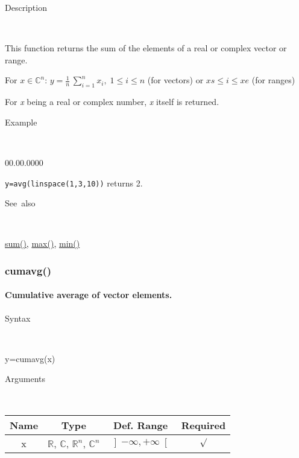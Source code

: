\begin{description}
\item [Description]~
\end{description}
This function returns the sum of the elements of a real or complex
vector or range.

\medskip{}
For $x\in$$\mathbb{C}^{n}$: $y={\displaystyle \frac{1}{n}}\,$$\sum\limits _{i=1}^{n}x_{i},\;1\leq i\leq n$
(for vectors) or $xs\leq i\leq xe$ (for ranges)
\medskip{}

For \textit{x} being a real or complex number, \textit{x}
itself is returned.

\begin{description}
\item [Example]~
\end{description}
\begin{lyxlist}{00.00.0000}
\item [\texttt{y=avg(linspace(1,3,10))}]returns 2.
\end{lyxlist}
\begin{description}
\item [See~also]~
\end{description}
\textcolor{blue}{\hyperlink{sum}{sum()}}\textcolor{black}{,} \textcolor{blue}{\hyperlink{max}{max()}}\textcolor{black}{,}
\textcolor{blue}{\hyperlink{min}{min()}}


\newpage
\subsubsection*{\hypertarget{cumavg}{}{\Large cumavg()}}


\paragraph{\label{par:Cumulative-average}Cumulative average of vector elements.}

\begin{description}
\item [Syntax]~
\end{description}
y=cumavg(x)

\begin{description}
\item [Arguments]~
\end{description}
\begin{tabular}{|c|c|c|c|}
\hline 
Name&
Type&
Def. Range&
Required\tabularnewline
\hline
\hline 
x&
$\mathbb{R}$, $\mathbb{C}$, $\mathbb{R}^{n}$, $\mathbb{C}^{n}$&
$\left]-\infty,+\infty\right[$&
$\surd$\tabularnewline
\hline
\end{tabular}

